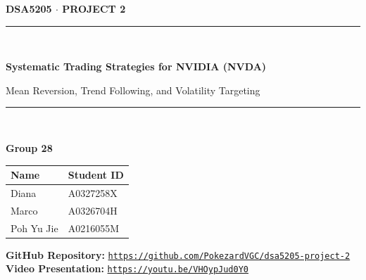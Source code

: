 \documentclass[11pt, a4paper]{article}
\begin{document}
\begin{titlepage}
\centering
\vspace*{0.35in}
{\large\bfseries DSA5205 $\cdot$ PROJECT 2\par}
\vspace{0.20in}
\rule{\linewidth}{0.8pt}\\[0.18in]
{\LARGE\bfseries Systematic Trading Strategies for NVIDIA (NVDA)\par}
\vspace{0.10in}
{\Large Mean Reversion, Trend Following, and Volatility Targeting\par}
\vspace{0.15in}
\rule{\linewidth}{0.8pt}\\[0.25in]

{\Large\bfseries Group 28\par}
\vspace{0.15in}

\begin{table}[H]
\centering
\normalsize
\renewcommand{\arraystretch}{1.20}
\begin{tabular}{l l}
\toprule
\textbf{Name} & \textbf{Student ID} \\
\midrule
Diana & A0327258X \\
Marco & A0326704H \\
Poh Yu Jie & A0216055M \\
\bottomrule
\end{tabular}
\end{table}

\vspace{0.15in}

{\small
\textbf{GitHub Repository:} \href{https://github.com/PokezardVGC/dsa5205-project-2}{\texttt{https://github.com/PokezardVGC/dsa5205-project-2}}\\[0.06in]
\textbf{Video Presentation:} \href{https://youtu.be/VHOypJud0Y0}{\texttt{https://youtu.be/VHOypJud0Y0}}\par
}

\vspace{0.20in}


\end{titlepage}
\end{document}
